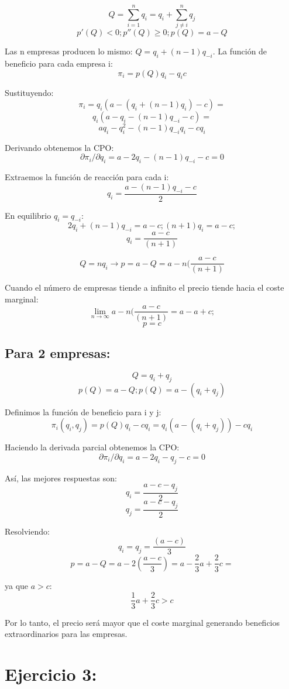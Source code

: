 \documentclass{article}
\begin{document}
$$Q=\sum_{i=1}^nq_i=q_i+\sum_{j\neq i}^nq_j$$             
$$p'(Q)<0; p''(Q)\geq0; p(Q)=a-Q$$                                
         
Las n empresas producen lo mismo: $Q=q_i+(n-1)q_{-i}$.
                                                                                                                                                                                              La funci\'on de beneficio para cada empresa i:            
$$\pi_i=p(Q)q_i-q_ic$$

Sustituyendo:
$$\pi_i=q_i(a-(q_i+(n-1)q_i)-c)=$$
$$q_i(a-q_i-(n-1)q_{-i}-c)=$$
$$aq_i-q_i^2-(n-1)q_{-i}q_i-cq_i$$

Derivando obtenemos la CPO:
$$\partial \pi_i/\partial q_i= a-2q_i-(n-1)q_{-i}-c=0$$

Extraemos la funci\'on de reacci\'on para cada i:
$$q_i=\frac{a-(n-1)q_{-i}-c}{2}$$

En equilibrio $q_i=q_{-i}$:
$$2q_i+(n-1)q_{-i}=a-c; (n+1)q_i=a-c;$$
$$q_i=\frac{a-c}{(n+1)}$$

$$Q=nq_i \rightarrow p=a-Q=a-n(\frac{a-c}{(n+1)}$$

Cuando el n\'umero de empresas tiende a infinito el precio tiende hacia el coste marginal:
$$\lim_{n\rightarrow \infty}a-n(\frac{a-c}{(n+1)}=a-a+c;$$
$$p=c$$

\subsection{Para 2 empresas:}

$$Q=q_i+q_j$$
$$p(Q)=a-Q; p(Q)=a-(q_i+q_j)$$

Definimos la funci\'on de beneficio para i y j:
$$\pi_i(q_i,q_j)=p(Q)q_i-cq_i=q_i(a-(q_i+q_j))-cq_i$$

Haciendo la derivada parcial obtenemos la CPO:
$$\partial \pi_i/\partial q_i= a-2q_i-q_j-c=0$$

As\'i, las mejores respuestas son:
$$q_i=\frac{a-c-q_j}{2}$$
$$q_j=\frac{a-c-q_j}{2}$$

Resolviendo:
$$q_i=q_j=\frac{(a-c)}{3}$$
$$p=a-Q=a-2(\frac{a-c}{3})=a-\frac{2}{3}a+\frac{2}{3}c=$$

ya que $a>c$:
$$\frac{1}{3}a+\frac{2}{3}c>c$$

Por lo tanto, el precio ser\'a mayor que el coste marginal generando beneficios extraordinarios para las empresas.

\section{Ejercicio 3:}
\end{document}
